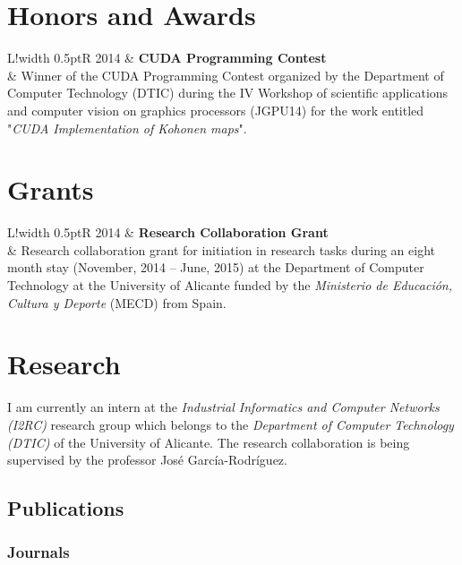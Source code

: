 \documentclass[8pt]{article}
\newcommand\VRule{\color{lightgray}\vrule width 0.5pt}
\begin{document}
\section*{Honors and Awards}
\begin{tabular}{L!{\VRule}R}
2014 & \textbf{CUDA Programming Contest}\\
& Winner of the CUDA Programming Contest organized by the Department of Computer Technology (DTIC) during the IV Workshop of scientific applications and computer vision on graphics processors (JGPU14) for the work entitled "\textit{CUDA Implementation of Kohonen maps}".
\end{tabular}

\section*{Grants}
\begin{tabular}{L!{\VRule}R}
2014 & \textbf{Research Collaboration Grant}\\
& Research collaboration grant for initiation in research tasks during an eight month stay (November, 2014 -- June, 2015) at the Department of Computer Technology at the University of Alicante funded by the \textit{Ministerio de Educación, Cultura y Deporte} (MECD) from Spain.
\end{tabular}

\section*{Research}

I am currently an intern at the \textit{Industrial Informatics and Computer Networks (I2RC)} research group which belongs to the \textit{Department of Computer Technology (DTIC)} of the University of Alicante. The research collaboration is being supervised by the professor José García-Rodríguez.

\subsection*{Publications}

\subsubsection*{Journals}
\end{document}
